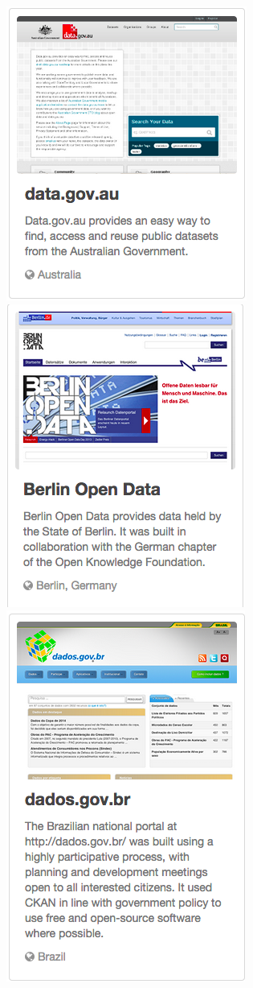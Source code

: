\includegraphics{Images/AustraliaOpenData} \\
\includegraphics{Images/BerlinOpenData} \\
\includegraphics{Images/BrasilOpenData} \\
